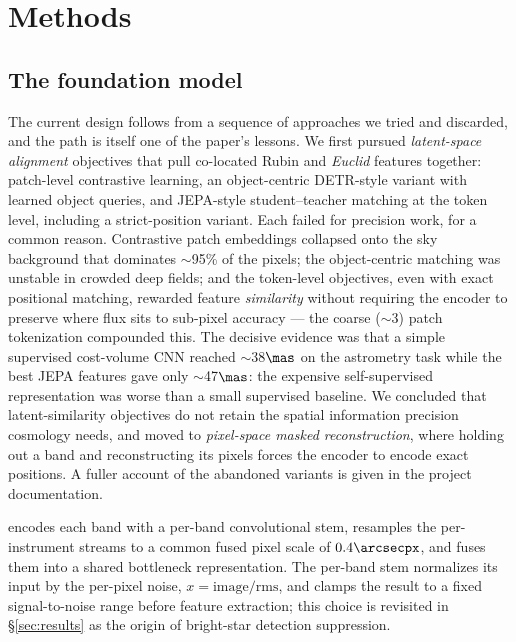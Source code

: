 \section{Methods}
\label{sec:methods}

\subsection{The \jaisp{} foundation model}
\label{sec:methods:foundation}

The current design follows from a sequence of approaches we tried and
discarded, and the path is itself one of the paper's lessons. We first pursued
\emph{latent-space alignment} objectives that pull co-located Rubin and
\textit{Euclid} features together: patch-level contrastive learning, an
object-centric DETR-style variant with learned object queries, and
JEPA-style student--teacher matching at the token level, including a
strict-position variant. Each failed for precision work, for a common reason.
Contrastive patch embeddings collapsed onto the sky background that dominates
$\sim$95\% of the pixels; the object-centric matching was unstable in crowded
deep fields; and the token-level objectives, even with exact positional
matching, rewarded feature \emph{similarity} without requiring the encoder to
preserve where flux sits to sub-pixel accuracy --- the coarse ($\sim$3\arcsec)
patch tokenization compounded this. The decisive evidence was that a simple
supervised cost-volume CNN reached $\sim$38$\mas$ on the astrometry task while
the best JEPA features gave only $\sim$47$\mas$: the expensive self-supervised
representation was worse than a small supervised baseline. We concluded that
latent-similarity objectives do not retain the spatial information precision
cosmology needs, and moved to \emph{pixel-space masked reconstruction}, where
holding out a band and reconstructing its pixels forces the encoder to encode
exact positions. A fuller account of the abandoned variants is given in the
project documentation.

\jaisp{} encodes each band with a per-band convolutional stem, resamples the
per-instrument streams to a common fused pixel scale of $0.4\arcsecpx$, and
fuses them into a shared bottleneck representation. 
The per-band stem normalizes its input by the per-pixel noise,
$x = \mathrm{image}/\mathrm{rms}$, and clamps the result to a fixed
signal-to-noise range before feature extraction; this choice is revisited in
\S\ref{sec:results} as the origin of bright-star detection suppression.

